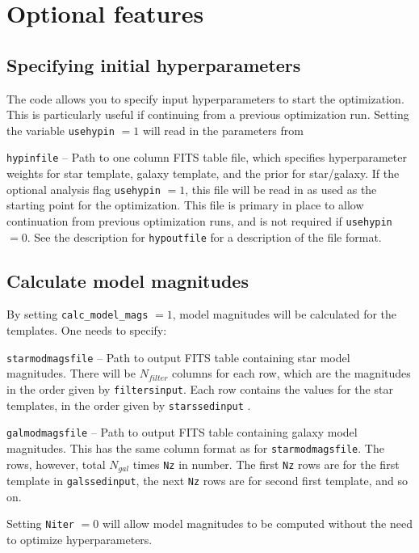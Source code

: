 \documentclass[12pt,preprint]{aastex}
\begin{document}
\section{Optional features}
\label{sec:optional}

\subsection{Specifying initial hyperparameters}

The code allows you to specify input hyperparameters to start the optimization.  This is 
particularly useful if continuing from a previous optimization run.  Setting the variable 
{\tt usehypin} $=1$ will read in the parameters from 

{\tt hypinfile} -- Path to one column FITS table file, which specifies hyperparameter 
weights for star template, galaxy template, and the prior for star/galaxy.  If the optional 
analysis flag {\tt usehypin} $= 1$, this file will be read in as used as the starting point 
for the optimization.  This file is primary in place to allow continuation from previous 
optimization runs, and is not required if  {\tt usehypin} $= 0$.  See the description for 
{\tt hypoutfile} for a description of the file format.

\subsection{Calculate model magnitudes}

By setting {\tt calc\_model\_mags} $=1$, model magnitudes will be calculated for the 
templates.  One needs to specify:

{\tt starmodmagsfile} -- Path to output FITS table containing star model magnitudes.  
There will be $N_{filter}$ columns for each row, which are the magnitudes in the order 
given by {\tt filtersinput}.  Each row contains the values for the star templates, in the 
order given by {\tt starssedinput} .

{\tt galmodmagsfile} -- Path to output FITS table containing galaxy model magnitudes.  
This has the same column format as for {\tt starmodmagsfile}.  The rows, however, 
total $N_{gal}$ times {\tt Nz} in number.  The first {\tt Nz} rows are for the first template 
in {\tt galssedinput}, the next {\tt Nz} rows are for second first template, and so on.

Setting {\tt Niter} $=0$ will allow model magnitudes to be computed without the need 
to optimize hyperparameters.
\end{document}
